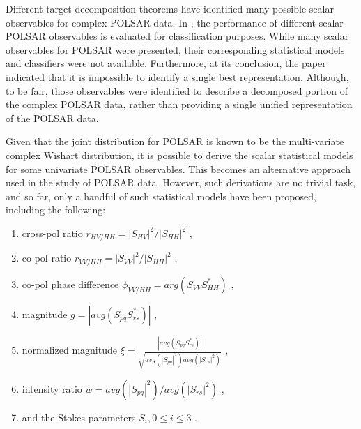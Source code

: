 \documentclass[journal]{IEEEtran}
\begin{document}
Different target decomposition theorems have identified many possible scalar observables for complex POLSAR data.
In \cite{Alberga_2008_IJRS_4129}, the performance of different scalar POLSAR observables is evaluated for classification purposes.
While many scalar observables for POLSAR were presented, their corresponding statistical models and classifiers were not available.
Furthermore, at its conclusion, the paper indicated that it is impossible to identify a single best representation.
Although, to be fair, those observables were identified to describe a decomposed portion of the complex POLSAR data,
  rather than providing a single unified representation of the POLSAR data.

Given that the joint distribution for POLSAR is known to be the multi-variate complex Wishart distribution,
  it is possible to derive the scalar statistical models for some univariate POLSAR observables.
This becomes an alternative approach used in the study of POLSAR data.
However, such derivations are no trivial task, and so far, only a handful of such statistical models have been proposed, including the following:
  \begin{enumerate}
  \item cross-pol ratio $r_{HV/HH} = |S_{HV}|^2/|S_{HH}|^2$ \cite{Joughin_1994_TGRS_562},
  \item co-pol ratio $r_{VV/HH} = |S_{VV}|^2/|S_{HH}|^2$ \cite{Joughin_1994_TGRS_562},
  \item co-pol phase difference $\phi_{VV/HH} = arg(S_{VV}S_{HH}^*) $ \cite{Joughin_1994_TGRS_562} \cite{Lee_1994_TGRS_1017},
  \item magnitude $g=|avg(S_{pq}S_{rs}^*)|$ \cite{Lee_1994_TGRS_1017},
  \item normalized magnitude $\xi = \frac{|avg(S_{pq}S_{rs}^*)|}{\sqrt{avg(|S_{pq}|^2) avg(|S_{rs}|^2)}}$ \cite{Lee_1994_TGRS_1017},
  \item intensity ratio $w = avg(|S_{pq}|^2)/avg(|S_{rs}|^2)$ \cite{Lee_1994_TGRS_1017},
  \item and the Stokes parameters $S_i,0 \leq i \leq 3$ \cite{Touzi_1996_TGRS_519}. 
  \end{enumerate}
\end{document}

